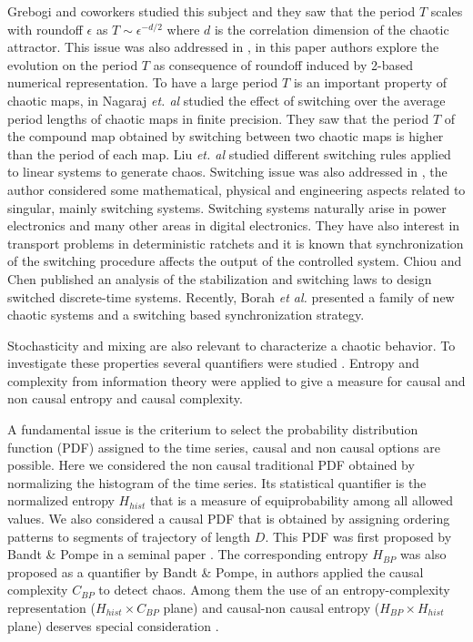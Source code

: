 Grebogi and coworkers \cite{Grebogi1988} studied this subject and they saw that the period $T$ scales with roundoff $\epsilon$ as $T\sim\epsilon^{-d/2}$ where $d$ is the correlation dimension of the chaotic attractor.
This issue was also addressed in \cite{Persohn2012}, in this paper authors explore the evolution on the period $T$ as consequence of roundoff induced by 2-based numerical representation.
To have a large period $T$ is an important property of chaotic maps, in \cite{Nagaraj2008} Nagaraj \textit{et. al} studied the effect of switching over the average period lengths of chaotic maps in finite precision.
They saw that the period $T$ of the compound map obtained by switching between two chaotic maps is higher than the period of each map.
Liu \textit{et. al} \cite{Liu2006} studied different switching rules applied to linear systems to generate chaos.
Switching issue was also addressed in \cite{Gluskin2008}, the author considered some mathematical, physical and engineering aspects related to singular, mainly switching systems.
Switching systems naturally arise in power electronics and many other areas in digital electronics.
They have also interest in transport problems in deterministic ratchets \cite{Zarlenga2009} and it is known that synchronization of the switching procedure affects the output of the controlled system.
Chiou and Chen \cite{Chiou2009} published an analysis of the stabilization and switching laws to design switched discrete-time systems.
Recently, Borah \textit{et al.} \cite{Borah2017} presented a family of new chaotic systems and a switching based synchronization strategy.

Stochasticity and mixing are also relevant to characterize a chaotic behavior.
To investigate these properties several quantifiers were studied \cite{DeMicco2009}.
Entropy and complexity from information theory were applied to give a measure for causal and non causal entropy and causal complexity.

A fundamental issue is the criterium to select the probability distribution function (PDF) assigned to the time series, causal and non causal options are possible.
Here we considered the non causal traditional PDF obtained by normalizing the histogram of the time series.
Its statistical quantifier is the normalized entropy $H_{hist}$ that is a measure of equiprobability among all allowed values.
We also considered a causal PDF that is obtained by assigning ordering patterns to segments of trajectory of length $D$.
This PDF was first proposed by Bandt \& Pompe in a seminal paper \cite{Bandt2002}.
The corresponding entropy $H_{BP}$ was also proposed as a quantifier by Bandt \& Pompe, in \cite{Rosso2007} authors applied the causal complexity $C_{BP}$ to detect chaos.
Among them the use of an entropy-complexity representation ($H_{hist} \times C_{BP}$ plane) and causal-non causal entropy ($H_{BP} \times H_{hist}$ plane) deserves special consideration \cite{DeMicco2009,Rosso2007,DeMicco2008,DeMicco2012,Rosso2007a,Rosso2010,Antonelli2017}.

